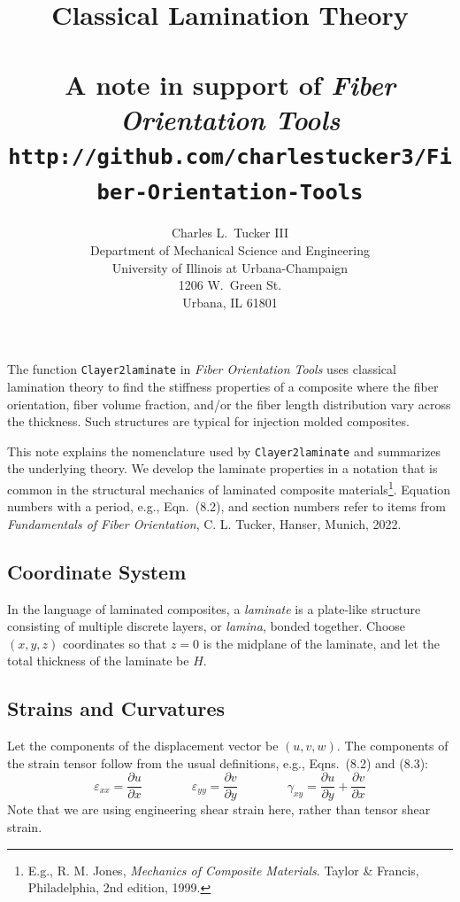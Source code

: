 \documentclass[11pt]{article}
\title{Classical Lamination Theory \\
      { \normalsize ~ \\ A note in support of \textit{Fiber Orientation Tools} \\
       \texttt{http://github.com/charlestucker3/Fiber-Orientation-Tools}}}
\author{Charles L.~Tucker III \\
       Department of Mechanical Science and Engineering \\
        University of Illinois at Urbana-Champaign \\
        1206 W.~Green St. \\
        Urbana, IL 61801 \\
        }
\begin{document}
\maketitle

The function \texttt{Clayer2laminate} in \emph{Fiber Orientation Tools} uses classical lamination theory to find the stiffness properties of a composite where the fiber orientation, fiber volume fraction, and/or the fiber length distribution vary across the thickness.  Such structures are typical for injection molded composites.  

This note explains the nomenclature used by \texttt{Clayer2laminate} and summarizes the underlying theory.  We develop the laminate properties in a notation  that is common in the structural mechanics of laminated composite materials\footnote{E.g., R. M. Jones, \emph{Mechanics of Composite Materials}. Taylor \& Francis, Philadelphia, 2nd edition, 1999.}.  Equation numbers with a period, e.g., Eqn.~(8.2), and section numbers refer to items from \emph{Fundamentals of Fiber Orientation}, C. L. Tucker, Hanser, Munich, 2022.  

\subsection*{Coordinate System}

In the language of laminated composites, a \emph{laminate} is a plate-like structure consisting of multiple discrete layers, or \emph{lamina}, bonded together.  Choose $(x,y,z)$ coordinates so that $z = 0$ is the midplane of the laminate, and let the total thickness of the laminate be $H$.  

\subsection*{Strains and Curvatures}

Let the components of the displacement vector be $(u, v, w)$.  The components of the strain tensor follow from the usual definitions, e.g., Eqns.~(8.2) and (8.3):
\begin{equation}
   \varepsilon_{xx} = \frac{\partial u}{\partial x}   \qquad  \qquad
   \varepsilon_{yy} = \frac{\partial v}{\partial y}   \qquad  \qquad
   \gamma_{xy} = \frac{\partial u}{\partial y} + \frac{\partial v}{\partial x} 
   \label{epsilonDef}
\end{equation}
Note that we are using engineering shear strain here, rather than tensor shear strain.  
\end{document}
